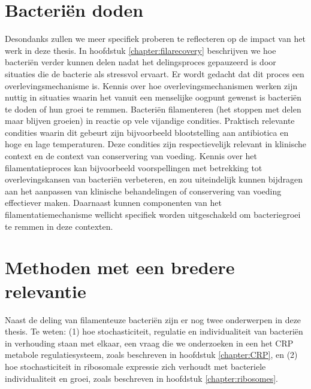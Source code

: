 \section*{Bacteriën doden}

Desondanks zullen we meer specifiek proberen te reflecteren op de impact van het werk in deze thesis.
%
In hoofdstuk \ref{chapter:filarecovery} beschrijven we hoe bacteriën verder kunnen delen nadat
het delingsproces gepauzeerd is door situaties die de bacterie als stressvol ervaart. 
%
Er wordt gedacht dat dit proces een overlevingsmechanisme is.
%
Kennis over hoe overlevingsmechanismen werken zijn nuttig in situaties waarin
het vanuit een menselijke oogpunt gewenst is bacteriën te doden of hun groei te remmen.
%
Bacteriën filamenteren (het stoppen met delen maar blijven groeien) in reactie op vele vijandige condities. 
Praktisch relevante condities waarin dit gebeurt zijn bijvoorbeeld blootstelling aan antibiotica en hoge en lage temperaturen.
%
Deze condities zijn respectievelijk relevant in klinische context en de context van conservering van voeding.
%
Kennis over het filamentatieproces kan bijvoorbeeld voorspellingen met betrekking tot overlevingskansen van bacteriën verbeteren,
en zou uiteindelijk kunnen bijdragen aan het aanpassen van klinische behandelingen of conservering van voeding effectiever maken. 
%
Daarnaast kunnen componenten van het filamentatiemechanisme wellicht specifiek worden uitgeschakeld om 
bacteriegroei te remmen in deze contexten.


\section*{Methoden met een bredere relevantie}

Naast de deling van filamenteuze bacteriën zijn er nog twee onderwerpen in deze thesis.
%
Te weten: 
(1) hoe stochasticiteit, regulatie en individualiteit van bacteriën in verhouding staan met elkaar, een vraag die we onderzoeken in een het CRP metabole regulatiesysteem, zoals beschreven in hoofdstuk \ref{chapter:CRP},
en (2) hoe stochasticiteit in ribosomale expressie zich verhoudt met bacteriele individualiteit en groei, zoals beschreven in hoofdstuk \ref{chapter:ribosomes}.


